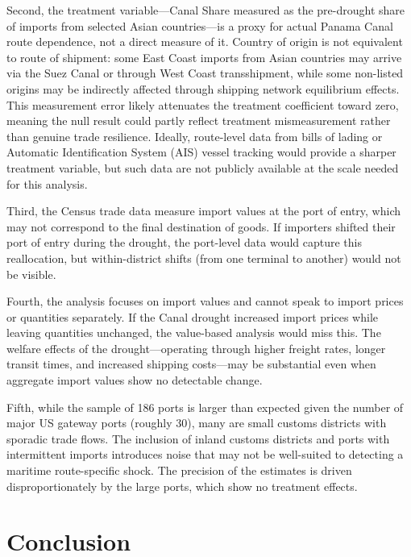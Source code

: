 \documentclass[12pt]{article}
\begin{document}
Second, the treatment variable---Canal Share measured as the pre-drought share of imports from selected Asian countries---is a proxy for actual Panama Canal route dependence, not a direct measure of it. Country of origin is not equivalent to route of shipment: some East Coast imports from Asian countries may arrive via the Suez Canal or through West Coast transshipment, while some non-listed origins may be indirectly affected through shipping network equilibrium effects. This measurement error likely attenuates the treatment coefficient toward zero, meaning the null result could partly reflect treatment mismeasurement rather than genuine trade resilience. Ideally, route-level data from bills of lading or Automatic Identification System (AIS) vessel tracking would provide a sharper treatment variable, but such data are not publicly available at the scale needed for this analysis.

Third, the Census trade data measure import values at the port of entry, which may not correspond to the final destination of goods. If importers shifted their port of entry during the drought, the port-level data would capture this reallocation, but within-district shifts (from one terminal to another) would not be visible.

Fourth, the analysis focuses on import values and cannot speak to import prices or quantities separately. If the Canal drought increased import prices while leaving quantities unchanged, the value-based analysis would miss this. The welfare effects of the drought---operating through higher freight rates, longer transit times, and increased shipping costs---may be substantial even when aggregate import values show no detectable change.

Fifth, while the sample of 186 ports is larger than expected given the number of major US gateway ports (roughly 30), many are small customs districts with sporadic trade flows. The inclusion of inland customs districts and ports with intermittent imports introduces noise that may not be well-suited to detecting a maritime route-specific shock. The precision of the estimates is driven disproportionately by the large ports, which show no treatment effects.


\section{Conclusion}
\label{sec:conclusion}
\end{document}
